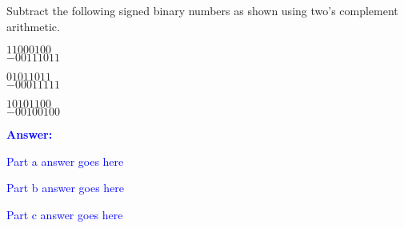 \item{}
Subtract the following signed binary numbers as shown using two's complement
arithmetic.
\begin{list}{\textbf{}}{}
    \item\noindent\phantom{$-$}$11000100$\\
    \underline{$-00111011$}\\
    \item\noindent\phantom{$-$}$01011011$\\
    \underline{$-00011111$}\\
    \item\noindent\phantom{$-$}$10101100$\\
    \underline{$-00100100$}\\
\end{list}
\vskip12pt
\ifanswers
\textcolor{blue}{
\textbf{Answer:}\\
\begin{list}{\textbf{}}{}
    \item Part a answer goes here
    \item Part b answer goes here
    \item Part c answer goes here
\end{list}
}
\newpage
\fi
